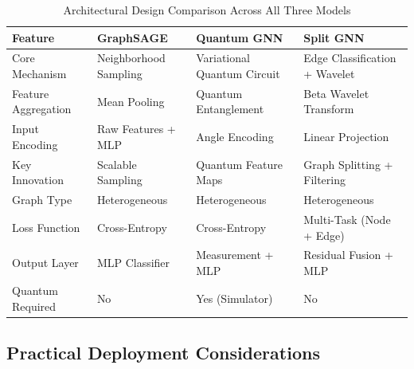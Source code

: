 \begin{table}[H]
\centering
\tablestrut
\caption{Architectural Design Comparison Across All Three Models}
\label{tab:gnn-arch-comparison}
\small
\begin{tabularx}{\textwidth}{l>{\centering\arraybackslash}X>{\centering\arraybackslash}X>{\centering\arraybackslash}X}
\toprule
\textbf{Feature} & \textbf{GraphSAGE} & \textbf{Quantum GNN} & \textbf{Split GNN} \\
\midrule
Core Mechanism      & Neighborhood Sampling    & Variational Quantum Circuit & Edge Classification + Wavelet \\
Feature Aggregation & Mean Pooling             & Quantum Entanglement        & Beta Wavelet Transform \\
Input Encoding      & Raw Features + MLP       & Angle Encoding              & Linear Projection \\
Key Innovation      & Scalable Sampling        & Quantum Feature Maps        & Graph Splitting + Filtering \\
Graph Type          & Heterogeneous            & Heterogeneous               & Heterogeneous \\
Loss Function       & Cross-Entropy            & Cross-Entropy               & Multi-Task (Node + Edge) \\
Output Layer        & MLP Classifier           & Measurement + MLP           & Residual Fusion + MLP \\
Quantum Required    & No                       & Yes (Simulator)             & No \\
\bottomrule
\end{tabularx}
\end{table}

\subsection{Practical Deployment Considerations}

